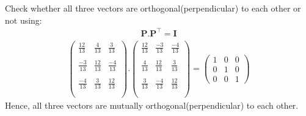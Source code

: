 \documentclass[12pt]{article}
\newcommand{\myvec}[1]{\ensuremath{\begin{pmatrix}#1\end{pmatrix}}}
\let\vec\mathbf
\begin{document}
	Check whether all three vectors are orthogonal(perpendicular) to each other or not using:
		\begin{align}
		\vec{P}.\vec{P}^\top=\vec{I}
		\end{align}
		\begin{align}
	\myvec{\frac{12}{13}&\frac{4}{13}    &\frac{3}{13}\\\\ \frac{-3}{13}&\frac{12}{13}&\frac{-4}{13}\\\\ \frac{-4}{13}&\frac{3}{13}&\frac{12}{13}\\\\}.\myvec{\frac{12}{13}&\frac{-3}{13}   &\frac{-4}{13}\\\\ \frac{4}{13}&\frac{12}{13}&\frac{3}{13}\\\\ \frac{3}{13}&\frac{-4}{13}&\frac{12}{13}\\\\}=\myvec{1&0&0\\0&1&0\\0&0&1}
		\end{align}
		Hence, all three vectors are mutually orthogonal(perpendicular) to each other.
\end{document}
